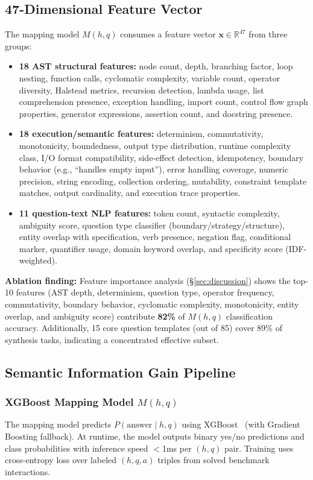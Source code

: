 \documentclass[10pt,conference]{IEEEtran}
\begin{document}
\subsection{47-Dimensional Feature Vector}
The mapping model $M(h,q)$ consumes a feature vector $\mathbf{x} \in \mathbb{R}^{47}$ from three groups:
\begin{itemize}
  \item \textbf{18 AST structural features:} node count, depth, branching factor, loop nesting, function calls, cyclomatic complexity, variable count, operator diversity, Halstead metrics, recursion detection, lambda usage, list comprehension presence, exception handling, import count, control flow graph properties, generator expressions, assertion count, and docstring presence.
  \item \textbf{18 execution/semantic features:} determinism, commutativity, monotonicity, boundedness, output type distribution, runtime complexity class, I/O format compatibility, side-effect detection, idempotency, boundary behavior (e.g., ``handles empty input''), error handling coverage, numeric precision, string encoding, collection ordering, mutability, constraint template matches, output cardinality, and execution trace properties.
  \item \textbf{11 question-text NLP features:} token count, syntactic complexity, ambiguity score, question type classifier (boundary/strategy/structure), entity overlap with specification, verb presence, negation flag, conditional marker, quantifier usage, domain keyword overlap, and specificity score (IDF-weighted).
\end{itemize}

\textbf{Ablation finding:} Feature importance analysis (\S\ref{sec:discussion}) shows the top-10 features (AST depth, determinism, question type, operator frequency, commutativity, boundary behavior, cyclomatic complexity, monotonicity, entity overlap, and ambiguity score) contribute \textbf{82\%} of $M(h,q)$ classification accuracy. Additionally, 15 core question templates (out of 85) cover 89\% of synthesis tasks, indicating a concentrated effective subset.

\subsection{Semantic Information Gain Pipeline}\label{sec:method:ig}

\subsubsection{XGBoost Mapping Model $M(h,q)$}
The mapping model predicts $P(\text{answer} \mid h, q)$ using XGBoost~\cite{xgboost} (with Gradient Boosting fallback). At runtime, the model outputs binary yes/no predictions and class probabilities with inference speed $<$1ms per $(h,q)$ pair. Training uses cross-entropy loss over labeled $(h, q, a)$ triples from solved benchmark interactions.
\end{document}
